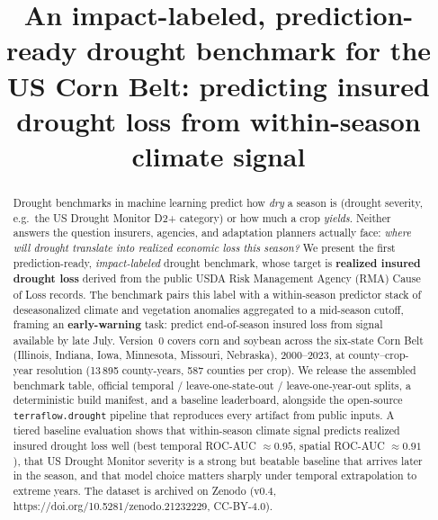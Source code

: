 \documentclass[essd, manuscript]{copernicus}
\begin{document}
\title{An impact-labeled, prediction-ready drought benchmark for the US Corn Belt: predicting insured drought loss from within-season climate signal}




\received{}
\pubdiscuss{}
\revised{}
\accepted{}
\published{}


\maketitle

\begin{abstract}
Drought benchmarks in machine learning predict how \emph{dry} a season is (drought severity, e.g.\ the US Drought Monitor D2+ category) or how much a crop \emph{yields}. Neither answers the question insurers, agencies, and adaptation planners actually face: \emph{where will drought translate into realized economic loss this season?} We present the first prediction-ready, \emph{impact-labeled} drought benchmark, whose target is \textbf{realized insured drought loss} derived from the public USDA Risk Management Agency (RMA) Cause of Loss records. The benchmark pairs this label with a within-season predictor stack of deseasonalized climate and vegetation anomalies aggregated to a mid-season cutoff, framing an \textbf{early-warning} task: predict end-of-season insured loss from signal available by late July. Version~0 covers corn and soybean across the six-state Corn Belt (Illinois, Indiana, Iowa, Minnesota, Missouri, Nebraska), 2000--2023, at county--crop-year resolution (13\,895 county-years, 587 counties per crop). We release the assembled benchmark table, official temporal / leave-one-state-out / leave-one-year-out splits, a deterministic build manifest, and a baseline leaderboard, alongside the open-source \texttt{terraflow.drought} pipeline that reproduces every artifact from public inputs. A tiered baseline evaluation shows that within-season climate signal predicts realized insured drought loss well (best temporal ROC-AUC $\approx 0.95$, spatial ROC-AUC $\approx 0.91$), that US Drought Monitor severity is a strong but beatable baseline that arrives later in the season, and that model choice matters sharply under temporal extrapolation to extreme years. The dataset is archived on Zenodo (v0.4, https://doi.org/10.5281/zenodo.21232229, CC-BY-4.0).
\end{abstract}
\end{document}
